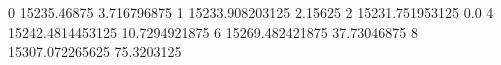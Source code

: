 0 15235.46875 3.716796875
1 15233.908203125 2.15625
2 15231.751953125 0.0
4 15242.4814453125 10.7294921875
6 15269.482421875 37.73046875
8 15307.072265625 75.3203125
